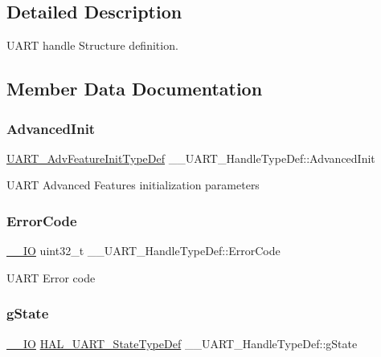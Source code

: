 \subsection{Detailed Description}
U\+A\+RT handle Structure definition. 

\subsection{Member Data Documentation}
\mbox{\label{struct_____u_a_r_t___handle_type_def_a88c54ae212a356b0cfef3192374ebb09}} 
\subsubsection{\texorpdfstring{AdvancedInit}{AdvancedInit}}
{\footnotesize\ttfamily \mbox{\hyperlink{struct_u_a_r_t___adv_feature_init_type_def}{U\+A\+R\+T\+\_\+\+Adv\+Feature\+Init\+Type\+Def}} \+\_\+\+\_\+\+U\+A\+R\+T\+\_\+\+Handle\+Type\+Def\+::\+Advanced\+Init}

U\+A\+RT Advanced Features initialization parameters \mbox{\label{struct_____u_a_r_t___handle_type_def_a0447bf9458caff1ad44ee7e947b1413f}} 
\subsubsection{\texorpdfstring{ErrorCode}{ErrorCode}}
{\footnotesize\ttfamily \mbox{\hyperlink{core__sc300_8h_aec43007d9998a0a0e01faede4133d6be}{\+\_\+\+\_\+\+IO}} uint32\+\_\+t \+\_\+\+\_\+\+U\+A\+R\+T\+\_\+\+Handle\+Type\+Def\+::\+Error\+Code}

U\+A\+RT Error code \mbox{\label{struct_____u_a_r_t___handle_type_def_a0c4242c009d8754417dfd87a5ab6cb10}} 
\subsubsection{\texorpdfstring{gState}{gState}}
{\footnotesize\ttfamily \mbox{\hyperlink{core__sc300_8h_aec43007d9998a0a0e01faede4133d6be}{\+\_\+\+\_\+\+IO}} \mbox{\hyperlink{group___u_a_r_t___exported___types_ga94c58ae1f4dbcf6032224edfc93a6e19}{H\+A\+L\+\_\+\+U\+A\+R\+T\+\_\+\+State\+Type\+Def}} \+\_\+\+\_\+\+U\+A\+R\+T\+\_\+\+Handle\+Type\+Def\+::g\+State}

